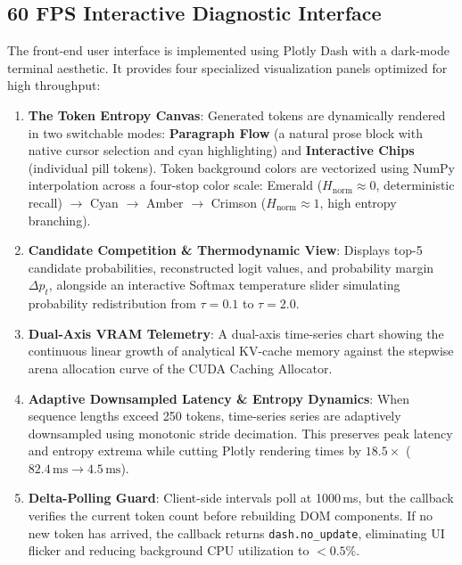 \documentclass[10pt,twocolumn]{article}
\begin{document}
\subsection{60 FPS Interactive Diagnostic Interface}
The front-end user interface is implemented using Plotly Dash with a dark-mode terminal aesthetic. It provides four specialized visualization panels optimized for high throughput:
\begin{enumerate}
    \item \textbf{The Token Entropy Canvas}: Generated tokens are dynamically rendered in two switchable modes: \textbf{Paragraph Flow} (a natural prose block with native cursor selection and cyan highlighting) and \textbf{Interactive Chips} (individual pill tokens). Token background colors are vectorized using NumPy interpolation across a four-stop color scale: Emerald ($H_{\text{norm}} \approx 0$, deterministic recall) $\to$ Cyan $\to$ Amber $\to$ Crimson ($H_{\text{norm}} \approx 1$, high entropy branching).
    \item \textbf{Candidate Competition \& Thermodynamic View}: Displays top-5 candidate probabilities, reconstructed logit values, and probability margin $\Delta p_t$, alongside an interactive Softmax temperature slider simulating probability redistribution from $\tau = 0.1$ to $\tau = 2.0$.
    \item \textbf{Dual-Axis VRAM Telemetry}: A dual-axis time-series chart showing the continuous linear growth of analytical KV-cache memory against the stepwise arena allocation curve of the CUDA Caching Allocator.
    \item \textbf{Adaptive Downsampled Latency \& Entropy Dynamics}: When sequence lengths exceed 250 tokens, time-series series are adaptively downsampled using monotonic stride decimation. This preserves peak latency and entropy extrema while cutting Plotly rendering times by $18.5\times$ ($82.4\,\text{ms} \to 4.5\,\text{ms}$).
    \item \textbf{Delta-Polling Guard}: Client-side intervals poll at 1000\,ms, but the callback verifies the current token count before rebuilding DOM components. If no new token has arrived, the callback returns \texttt{dash.no\_update}, eliminating UI flicker and reducing background CPU utilization to $<0.5\%$.
\end{enumerate}
\end{document}
